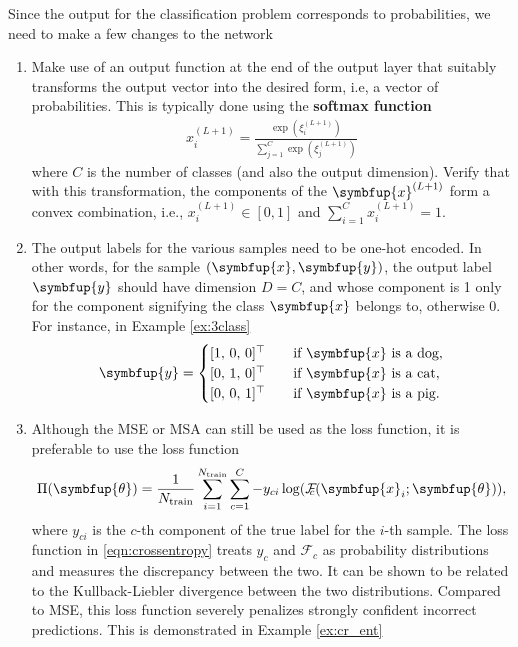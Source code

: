 \documentclass[11pt]{extarticle}
\newcommand{\vx}{\symbfup{x}}
\newcommand{\vy}{\symbfup{y}}
\theoremstyle{definition}
\newcommand{\btheta}{\symbfup{\theta}}
\begin{document}
Since the output for the classification problem corresponds to probabilities, we need to make a few changes to the network
\begin{enumerate}
  \item Make use of an output function at the end of the output layer that suitably transforms the output vector into the desired form, i.e, a vector of probabilities. This is typically done using the \textbf{softmax function}
  \begin{align*}
    x_i^{(L+1)} = \frac{\exp{(\xi_i^{(L+1)})}}{\sum_{j=1}^C\exp{(\xi_j^{(L+1)})}}
  \end{align*}
  where $C$ is the number of classes (and also the output dimension). Verify that with this transformation, the components of the $\vx^{(L+1)}$ form a convex combination, i.e., $x_i^{(L+1)} \in [0,1]$ and $\sum_{i=1}^C x_i^{(L+1)} = 1$.
  \item The output labels for the various samples need to be one-hot encoded. In other words, for the sample $(\vx, \vy)$, the output label $\vy$ should have dimension $D=C$, and whose component is 1 only for the component signifying the class $\vx$ belongs  to, otherwise 0. For instance, in Example \ref{ex:3class} 
  \begin{align*}
    \vy = \begin{cases}
      [1,\,0,\,0]^\top & \quad \text{if $\vx$ is a dog},\\ 
      [0,\,1,\,0]^\top & \quad \text{if $\vx$ is a cat},\\
      [0,\,0,\,1]^\top & \quad \text{if $\vx$ is a pig}.
    \end{cases}
  \end{align*}

  \item Although the MSE or MSA can still be used as the loss function, it is preferable to use the  loss function
    \begin{equation}\label{eqn:crossentropy}
      \Pi(\btheta) = \frac{1}{N_\text{train}} \sum_{i=1}^{N_\text{train}} \sum_{c=1}^{C} - y_{ci} \log(\mathcal{F}_{\!\!\!c}(\vx_i;\btheta)),
    \end{equation}
    where $y_{ci}$ is the $c$-th component of the true label for the $i$-th sample.
    The loss function in \eqref{eqn:crossentropy} treats $y_c$ and $\mathcal{F}_{\!\!\!c}$ as probability distributions and measures the discrepancy between the two. It can be shown to be related to the Kullback-Liebler divergence between the two distributions. Compared to MSE, this loss function severely penalizes strongly confident incorrect predictions. This is demonstrated in Example \ref{ex:cr_ent}
\end{enumerate}
\end{document}
